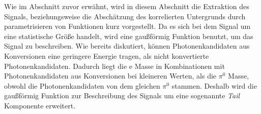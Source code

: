 Wie im Abschnitt zuvor erwähnt, wird in diesem Abschnitt die Extraktion des Signals, beziehungsweise die Abschätzung des korrelierten Untergrunds durch parametrisieren von Funktionen kurz vorgestellt.
\newline
Da es sich bei dem Signal um eine statistische Größe handelt, wird eine gaußförmig Funktion benutzt, um das Signal zu beschreiben.
\newline
Wie bereits diskutiert, können Photonenkandidaten aus Konversionen eine geringere Energie tragen, als nicht konvertierte Photonenkandidaten.
Dadurch liegt die                                                                                                                                                                                                                                                                                                                                                                                                                                                                                                                                                                                                                                                                                                                                                                                                                                                                                                                                                                                                                                                                                                                                                                                                                                                                                                                                                                                                                                                                                                                                                                                                       e Masse in Kombinationen mit Photonenkandidaten aus Konversionen bei kleineren Werten, als die $\pi^{0}$ Masse, obwohl die Photonenkandidaten von dem gleichen $\pi^{0}$ stammen.
Deshalb wird die gaußförmig Funktion zur Beschreibung des Signals um eine sogenannte \textit{Tail} Komponente erweitert.

